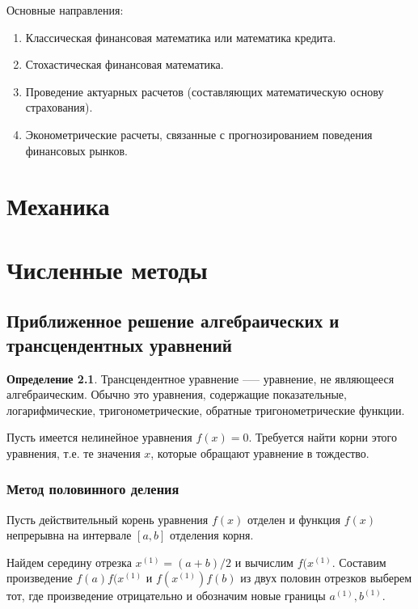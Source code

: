 \documentclass[12pt]{report}
\theoremstyle{definition}
\newtheorem{definition}[theorem]{Определение}
\begin{document}
Основные направления:

\begin{enumerate}
\item Классическая финансовая математика или математика кредита.
\item Стохастическая финансовая математика.
\item Проведение актуарных расчетов (составляющих математическую основу страхования).
\item Эконометрические расчеты, связанные с прогнозированием поведения
  финансовых рынков.
\end{enumerate}



\chapter{Механика}

\chapter{Численные методы}

\section{Приближенное решение алгебраических и трансцендентных уравнений}

\begin{definition}
Трансцендентное уравнение —-- уравнение, не являющееся алгебраическим.
Обычно это уравнения, содержащие показательные, логарифмические, 
тригонометрические, обратные тригонометрические функции.
\end{definition}

Пусть имеется нелинейное уравнения $f(x) = 0$. Требуется найти корни
этого уравнения, т.е. те значения $x$, которые обращают уравнение в
тождество.

\subsection{Метод половинного деления}
Пусть действительный корень уравнения $f(x)$ отделен
и функция $f(x)$ непрерывна на интервале $[a, b]$ отделения
корня.

Найдем середину отрезка $x^{(1)} = (a + b) / 2$ и вычислим $f(x^{(1)}$.
Составим произведение $f(a) f(x^{(1)}$ и $f(x^{(1)}) f(b)$ из двух половин
отрезков выберем тот, где произведение отрицательно и обозначим новые границы
$a^{(1)}, b^{(1)}$.
\end{document}
